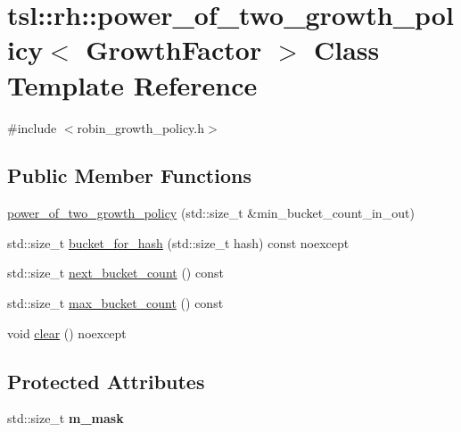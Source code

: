 \hypertarget{classtsl_1_1rh_1_1power__of__two__growth__policy}{}\section{tsl\+::rh\+::power\+\_\+of\+\_\+two\+\_\+growth\+\_\+policy$<$ Growth\+Factor $>$ Class Template Reference}
\label{classtsl_1_1rh_1_1power__of__two__growth__policy}


{\ttfamily \#include $<$robin\+\_\+growth\+\_\+policy.\+h$>$}

\subsection*{Public Member Functions}
\begin{DoxyCompactItemize}
\item 
\mbox{\hyperlink{classtsl_1_1rh_1_1power__of__two__growth__policy_a8b66b984743a4ba03c6b5862920b38b8}{power\+\_\+of\+\_\+two\+\_\+growth\+\_\+policy}} (std\+::size\+\_\+t \&min\+\_\+bucket\+\_\+count\+\_\+in\+\_\+out)
\item 
std\+::size\+\_\+t \mbox{\hyperlink{classtsl_1_1rh_1_1power__of__two__growth__policy_ae9f7810f6786c7ead8f3da64b0d1a719}{bucket\+\_\+for\+\_\+hash}} (std\+::size\+\_\+t hash) const noexcept
\item 
std\+::size\+\_\+t \mbox{\hyperlink{classtsl_1_1rh_1_1power__of__two__growth__policy_ab6ff2bc13c9a3c87cc8c90469e4191a3}{next\+\_\+bucket\+\_\+count}} () const
\item 
std\+::size\+\_\+t \mbox{\hyperlink{classtsl_1_1rh_1_1power__of__two__growth__policy_a837ee1d15d9f44004f8acbb5df116939}{max\+\_\+bucket\+\_\+count}} () const
\item 
void \mbox{\hyperlink{classtsl_1_1rh_1_1power__of__two__growth__policy_aff6441091ef925c6d669c69d9ccbcbbc}{clear}} () noexcept
\end{DoxyCompactItemize}
\subsection*{Protected Attributes}
\begin{DoxyCompactItemize}
\item 
\mbox{\label{classtsl_1_1rh_1_1power__of__two__growth__policy_a9702dee7851d32c1b839346f781e3f42}} 
std\+::size\+\_\+t {\bfseries m\+\_\+mask}
\end{DoxyCompactItemize}


